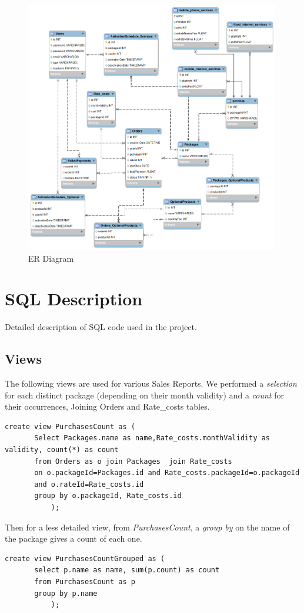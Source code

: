 \documentclass{article}
\begin{document}
\begin{figure}[hbt!]
\centering
\includegraphics[width=0.99\textwidth]{er2.png}
\caption{ER Diagram}
\end{figure}

\newpage
\section{SQL Description}

Detailed description of SQL code used in the project.
\subsection{Views}
\label{views}
The following views are used for various Sales Reports.
We performed a \emph{selection} for each distinct package (depending on their month validity) and a \emph{count} for their occurrences, Joining Orders and Rate_costs tables.

\begin{lstlisting}
create view PurchasesCount as (
       Select Packages.name as name,Rate_costs.monthValidity as validity, count(*) as count
       from Orders as o join Packages  join Rate_costs
       on o.packageId=Packages.id and Rate_costs.packageId=o.packageId 
       and o.rateId=Rate_costs.id
       group by o.packageId, Rate_costs.id
           );
\end{lstlisting}
Then for a less detailed view, from \emph{PurchasesCount}, a \emph{group by} on the name of the package gives a count of each one.
\begin{lstlisting}
create view PurchasesCountGrouped as (
       select p.name as name, sum(p.count) as count
       from PurchasesCount as p
       group by p.name
           );

\end{lstlisting}
\end{document}
